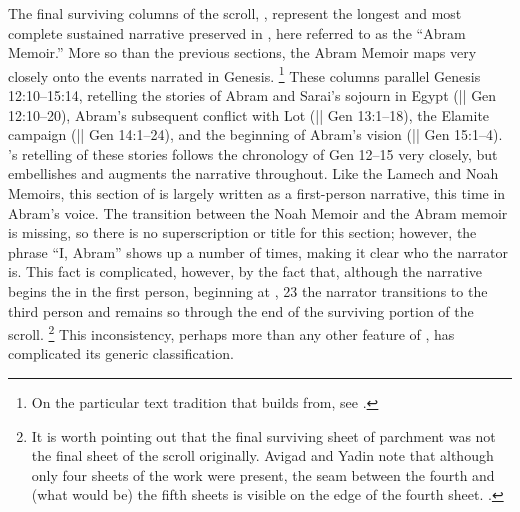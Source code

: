 
The final surviving columns of the scroll, , represent the longest and most complete sustained narrative preserved in \ga, here referred to as the ``Abram Memoir.'' More so than the previous sections, the Abram Memoir maps very closely onto the events narrated in Genesis.%
    \footnote{On the particular text tradition that \ga builds from, see \cite{vanderkam1978}.}
These columns parallel Genesis 12:10--15:14, retelling the stories of Abram and Sarai's sojourn in Egypt (|| Gen 12:10--20), Abram's subsequent conflict with Lot (|| Gen 13:1--18), the Elamite campaign (|| Gen 14:1--24), and the beginning of Abram's vision (|| Gen 15:1--4). \ga's retelling of these stories follows the chronology of Gen 12--15 very closely, but embellishes and augments the narrative throughout. Like the Lamech and Noah Memoirs, this section of \ga is largely written as a first-person narrative, this time in Abram's voice. The transition between the Noah Memoir and the Abram memoir is missing, so there is no superscription or title for this section; however, the phrase ``I, Abram'' shows up a number of times, making it clear who the narrator is. This fact is complicated, however, by the fact that, although the narrative begins the in the first person, beginning at , 23 the narrator transitions to the third person and remains so through the end of the surviving portion of the scroll.%
    \footnote{It is worth pointing out that the final surviving sheet of parchment was not the final sheet of the scroll originally. Avigad and Yadin note that although only four sheets of the work were present, the seam between the fourth and (what would be) the fifth sheets is visible on the edge of the fourth sheet. \cite*[14]{avigad-yadin1956}.}
This inconsistency, perhaps more than any other feature of \ga, has complicated its generic classification.

